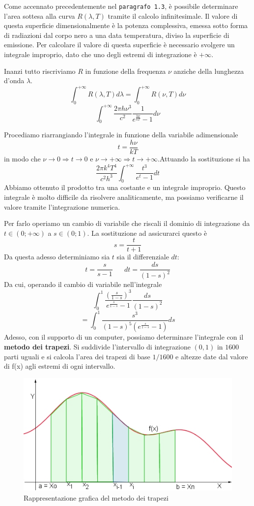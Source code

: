 \documentclass[12pt,twoside]{report}
\begin{document}
\par{Come accennato precedentemente nel \texttt{paragrafo 1.3}, è possibile determinare l’area sottesa alla curva $R(\lambda,T)$ tramite il calcolo infinitesimale. Il valore di questa superficie dimensionalmente è la potenza complessiva, emessa sotto forma di radiazioni dal corpo nero a una data temperatura, diviso la superficie di emissione. Per calcolare il valore di questa superficie è necessario svolgere un integrale improprio, dato che uno degli estremi di integrazione è $+\infty$.}
\par{Inanzi tutto riscriviamo $R$ in funzione della frequenza $\nu$ anziche della lunghezza d'onda $\lambda$. }
$$ \int_{0}^{+\infty}R(\lambda,T)d\lambda = \int_{0}^{+\infty}{R(\nu,T)}d\nu $$
$$ \int_{0}^{+\infty}\frac{2\pi h\nu^3}{c^2}\frac{1}{e^{ \frac{h\nu}{kT} }-1}d\nu $$ 
\par{Procediamo riarrangiando l'integrale in funzione della variabile adimensionale 
$$t = \frac{h\nu}{kT}$$
in modo che $\nu \to 0 \Longrightarrow t \to 0 $ e $\nu \to +\infty \Longrightarrow t \to +\infty $.\newline Attuando la sostituzione si ha 
$$ \frac{2\pi k^4 T^4}{c^2 h^3}\int_{0}^{+\infty}\frac{t^3}{e^t-1}dt $$
Abbiamo ottenuto il prodotto tra una costante e un integrale improprio. Questo integrale è molto difficile da risolvere analiticamente, ma possiamo verificarne il valore tramite l'integrazione numerica.}
\par{Per farlo operiamo un cambio di variabile che riscali il dominio di integrazione da $t \in (0;+\infty)$ a $s \in (0;1)$. La sostituzione ad assicurarci questo è 
$$ s = \frac{t}{t+1} $$
Da questa adesso determiniamo sia $t$ sia il differenziale $dt$:
$$ t = \frac{s}{s-1} \;\;\;\;\;\; dt = \frac{ds}{(1-s)^2} $$
Da cui, operando il cambio di variabile nell'integrale
$$  \int_0^1 \frac{(\frac{s}{1-s})^3}{e^{\frac{s}{1-s}}-1}\frac{ds}{(1-s)^2} $$
$$ = \int_0^1 \frac{s^3}{(1-s)^5 (e^{\frac{s}{1-s}}-1)}ds $$
Adesso, con il supporto di un computer, possiamo determinare l'integrale con il \textbf{metodo dei trapezi}. Si suddivide l'intervallo di integrazione $(0, 1)$ in $1600$ parti uguali e si calcola l'area dei trapezi di base $1/1600$ e altezze date dal valore di f(x) agli estremi di ogni intervallo.
}
\begin{figure}[!h]
\centering
\includegraphics[width = 0.5\hsize]{./figures/metTrapezi}
\caption{Rappresentazione grafica del metodo dei trapezi}
\label{fig:logo}
\end{figure}
\end{document}
